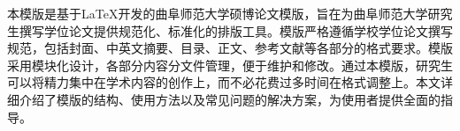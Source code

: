 本模版是基于\LaTeX{}开发的曲阜师范大学硕博论文模版，旨在为曲阜师范大学研究生撰写学位论文提供规范化、标准化的排版工具。模版严格遵循学校学位论文撰写规范，包括封面、中英文摘要、目录、正文、参考文献等各部分的格式要求。模版采用模块化设计，各部分内容分文件管理，便于维护和修改。通过本模版，研究生可以将精力集中在学术内容的创作上，而不必花费过多时间在格式调整上。本文详细介绍了模版的结构、使用方法以及常见问题的解决方案，为使用者提供全面的指导。


